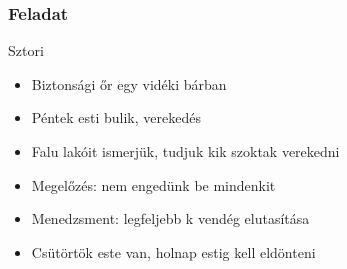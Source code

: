 \begin{frame}
\frametitle{Feladat}

Sztori
\begin{itemize}
\item Biztonsági őr egy vidéki bárban
\item Péntek esti bulik, verekedés
\item Falu lakóit ismerjük, tudjuk kik szoktak verekedni
\item Megelőzés: nem engedünk be mindenkit
\item Menedzsment: legfeljebb k vendég elutasítása
\item Csütörtök este van, holnap estig kell eldönteni
\end{itemize}

\end{frame}

